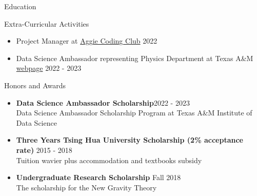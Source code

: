 \documentclass{resume}
\begin{document}
\begin{rSection}{Education}
\begin{rSection}{Extra-Curricular Activities}
    \begin{itemize}
        \item Project Manager at \href{https://aggiecodingclub.com/}{Aggie Coding Club} \hfill 2022
        \item Data Science Ambassador representing Physics Department at Texas A\&M \href{https://noctildon.github.io/DS_ambassador/index.html}{webpage} \hfill 2022 - 2023
    \end{itemize}
\end{rSection}


\begin{rSection}{Honors and Awards}
    \begin{itemize}
        \item \textbf{Data Science Ambassador Scholarship}\hfill 2022 - 2023\\
        Data Science Ambassador Scholarship Program at Texas A\&M Institute of Data Science
        \item \textbf{Three Years Tsing Hua University Scholarship (2\% acceptance rate)} \hfill 2015 - 2018 \\
        Tuition wavier plus accommodation and textbooks subsidy
        \item \textbf{Undergraduate Research Scholarship} \hfill Fall 2018 \\
        The scholarship for the New Gravity Theory
    \end{itemize}
\end{rSection}

\end{rSection}
\end{document}
